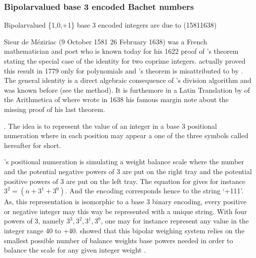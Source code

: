 \documentclass[a4paper,12pt,english]{sphinxhowto}
\begin{document}
\subsubsection{Bipolar\sphinxhyphen{}valued base 3 encoded Bachet numbers}
\label{\detokenize{pearls:bipolar-valued-base-3-encoded-bachet-numbers}}
\sphinxAtStartPar
Bipolar\sphinxhyphen{}valued \{\sphinxhyphen{}1,0,+1\} base 3 encoded integers are due to  (1581\sphinxhyphen{}1638) %
\begin{footnote}[20]\sphinxAtStartFootnote
{}  Sieur de Méziriac (9 October 1581 \textendash{} 26 February 1638) was a French mathematician and poet who is known today for his 1622 proof of ’s theorem stating the special case of the  identity for two coprime integers.  actually proved this result in 1779 only for polynomials and ’s theorem is misattributed to  by . The general  identity is a direct algebraic consequence of ’s division algorithm and was known before  (see the  method). It is furthemore in a Latin Translation by  of the Arithmetica of  where  wrote in 1638 his famous margin note about the missing proof of his last theorem.
%
\end{footnote}. The idea is to represent the value of an integer  in a base 3 positional numeration where in each position may appear a  \textendash{}one of the three symbols \textendash{} called hereafter  for short.

\sphinxAtStartPar
{}’s positional  numeration is simulating a weight balance scale where the number  and the potential negative powers of 3 are put on the right tray and the potential positive powers of 3 are put on the left tray. The equation for  gives for instance \(3^2 = (n + 3^1 + 3^0)\). And the  encoding corresponds hence to the string ‘+1\sphinxhyphen{}1\sphinxhyphen{}1’. As, this representation is isomorphic to a base 3 binary encoding, every positive or negative integer may this way be represented with a unique  string. With four powers of 3, namely \({3^3, 3^2, 3^1, 3^0}\), one may for instance represent any value in the integer range \sphinxhyphen{}40 to +40.  showed that this bipolar weighing system relies on the smallest possible number of balance weights \sphinxhyphen{}base powers\sphinxhyphen{} needed in order to balance the scale for any given integer weight  .
\end{document}
